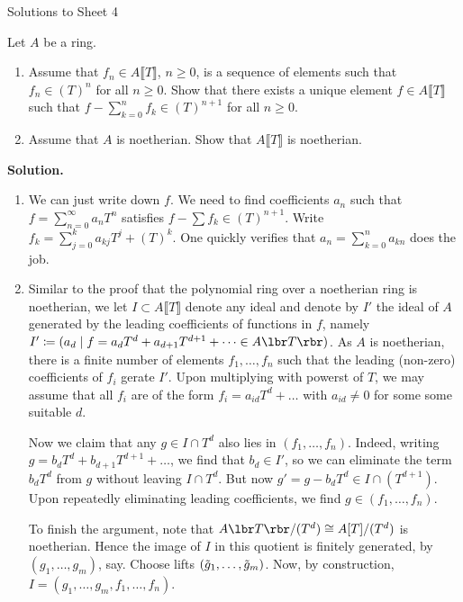\documentclass[a4paper,11pt]{article}
\begin{document}
\begin{center}
    \huge{Solutions to Sheet 4}
\end{center}

Let $A$ be a ring.
\begin{enumerate}
    \item Assume that $f_n \in A\llbracket T \rrbracket$, $n \geq 0$, is a sequence
        of elements such that $f_n \in (T)^n$ for all $n \geq 0$. Show that 
        there exists a unique element $f \in A\llbracket T \rrbracket$ such that 
        $f - \sum_{k=0}^n f_k \in (T)^{n+1}$ for all $n \geq 0$. 
    \item Assume that $A$ is noetherian. Show that $A\llbracket T \rrbracket$ is
        noetherian.
\end{enumerate}

\textbf{Solution.}
\begin{enumerate}
    \item We can just write down $f$. We need to find
        coefficients $a_n$ such that $f = \sum_{n=0}^\infty a_n T^n$ satisfies
        $f - \sum f_k \in (T)^{n+1}$. Write 
        $f_k = \sum_{j=0}^k a_{kj} T^j + (T)^k$. One quickly verifies that 
        $a_n = \sum_{k=0}^n a_{kn}$ does the job. 
    \item Similar to the proof that the polynomial ring over a noetherian ring is
        noetherian, we let $I \subset A\llbracket T \rrbracket$ denote any ideal
        and denote by $I'$ the ideal of $A$ generated by the leading coefficients of 
        functions in $f$, namely $I' \coloneqq (a_d \mid f = a_d T^d +
        a_{d+1}T^{d+1} + \dots \in A\lbr T \rbr)$. As $A$ is noetherian, there is 
        a finite number of elements $f_1, \dots, f_n$ such that the leading
        (non-zero) coefficients of $f_i$ gerate $I'$. Upon multiplying with
        powerst of $T$, we may assume that all $f_i$ are of the form $f_i =
        a_{id}T^d + \dots$ with $a_{id} \neq 0$ for some some 
        suitable $d$. 

        Now we claim that any $g \in I \cap T^{d}$ also lies in $(f_1, \dots,
        f_n)$. Indeed, writing $g = b_{d}T^{d} + b_{d+1} T^{d + 1} + \dots$, 
        we find that $b_{d} \in I'$, so we can eliminate the term $b_d T^d$ from 
        $g$ without leaving $I \cap T^d$. But now $g' = g - b_d T^d \in I \cap 
        (T^{d+1})$. Upon repeatedly eliminating leading coefficients, we find
        $g \in (f_1, \dots, f_n)$. 

        To finish the argument, note that $A\lbr T \rbr/(T^d) \cong A[T]/(T^d)$
        is noetherian. Hence the image of $I$ in this quotient is finitely generated,
        by $(g_1, \dots, g_m)$, say. Choose lifts $(\Tilde g_1, \dots, \Tilde g_m)$. 
        Now, by construction, $I = (g_1, \dots, g_m, f_1, \dots, f_n)$. 
        

\end{enumerate}
\end{document}
